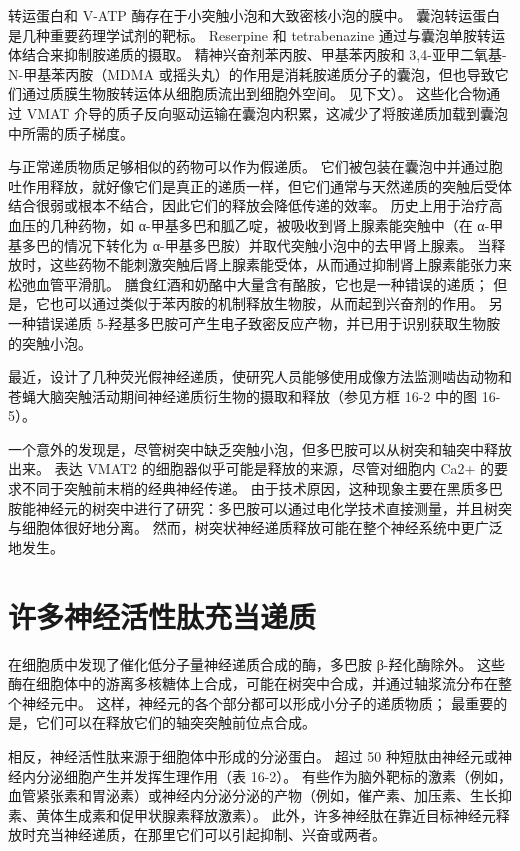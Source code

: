 转运蛋白和 V-ATP 酶存在于小突触小泡和大致密核小泡的膜中。 囊泡转运蛋白是几种重要药理学试剂的靶标。 Reserpine 和 tetrabenazine 通过与囊泡单胺转运体结合来抑制胺递质的摄取。 精神兴奋剂苯丙胺、甲基苯丙胺和 3,4-亚甲二氧基-N-甲基苯丙胺（MDMA 或摇头丸）的作用是消耗胺递质分子的囊泡，但也导致它们通过质膜生物胺转运体从细胞质流出到细胞外空间。 见下文）。 这些化合物通过 VMAT 介导的质子反向驱动运输在囊泡内积累，这减少了将胺递质加载到囊泡中所需的质子梯度。

与正常递质物质足够相似的药物可以作为假递质。 它们被包装在囊泡中并通过胞吐作用释放，就好像它们是真正的递质一样，但它们通常与天然递质的突触后受体结合很弱或根本不结合，因此它们的释放会降低传递的效率。 历史上用于治疗高血压的几种药物，如 α-甲基多巴和胍乙啶，被吸收到肾上腺素能突触中（在 α-甲基多巴的情况下转化为 α-甲基多巴胺）并取代突触小泡中的去甲肾上腺素。 当释放时，这些药物不能刺激突触后肾上腺素能受体，从而通过抑制肾上腺素能张力来松弛血管平滑肌。 膳食红酒和奶酪中大量含有酪胺，它也是一种错误的递质； 但是，它也可以通过类似于苯丙胺的机制释放生物胺，从而起到兴奋剂的作用。 另一种错误递质 5-羟基多巴胺可产生电子致密反应产物，并已用于识别获取生物胺的突触小泡。

最近，设计了几种荧光假神经递质，使研究人员能够使用成像方法监测啮齿动物和苍蝇大脑突触活动期间神经递质衍生物的摄取和释放（参见方框 16-2 中的图 16-5）。

一个意外的发现是，尽管树突中缺乏突触小泡，但多巴胺可以从树突和轴突中释放出来。 表达 VMAT2 的细胞器似乎可能是释放的来源，尽管对细胞内 Ca2+ 的要求不同于突触前末梢的经典神经传递。 由于技术原因，这种现象主要在黑质多巴胺能神经元的树突中进行了研究：多巴胺可以通过电化学技术直接测量，并且树突与细胞体很好地分离。 然而，树突状神经递质释放可能在整个神经系统中更广泛地发生。


\section{许多神经活性肽充当递质}

在细胞质中发现了催化低分子量神经递质合成的酶，多巴胺 β-羟化酶除外。 这些酶在细胞体中的游离多核糖体上合成，可能在树突中合成，并通过轴浆流分布在整个神经元中。 这样，神经元的各个部分都可以形成小分子的递质物质； 最重要的是，它们可以在释放它们的轴突突触前位点合成。

相反，神经活性肽来源于细胞体中形成的分泌蛋白。 超过 50 种短肽由神经元或神经内分泌细胞产生并发挥生理作用（表 16-2）。 有些作为脑外靶标的激素（例如，血管紧张素和胃泌素）或神经内分泌分泌的产物（例如，催产素、加压素、生长抑素、黄体生成素和促甲状腺素释放激素）。 此外，许多神经肽在靠近目标神经元释放时充当神经递质，在那里它们可以引起抑制、兴奋或两者。

